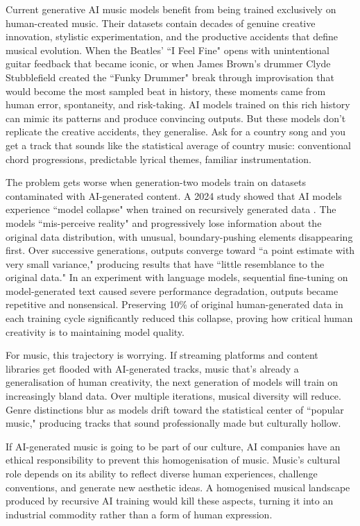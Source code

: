 \documentclass{article}
\begin{document}
Current generative AI music models benefit from being trained exclusively on human-created music. Their datasets contain decades of genuine creative innovation, stylistic experimentation, and the productive accidents that define musical evolution. When the Beatles' ``I Feel Fine" opens with unintentional guitar feedback that became iconic, or when James Brown's drummer Clyde Stubblefield created the ``Funky Drummer" break through improvisation that would become the most sampled beat in history, these moments came from human error, spontaneity, and risk-taking. AI models trained on this rich history can mimic its patterns and produce convincing outputs. But these models don't replicate the creative accidents, they generalise. Ask for a country song and you get a track that sounds like the statistical average of country music: conventional chord progressions, predictable lyrical themes, familiar instrumentation. 

The problem gets worse when generation-two models train on datasets contaminated with AI-generated content. A 2024 study showed that AI models experience ``model collapse" when trained on recursively generated data \cite{shumailov2024collapse}. The models ``mis-perceive reality" and progressively lose information about the original data distribution, with unusual, boundary-pushing elements disappearing first. Over successive generations, outputs converge toward ``a point estimate with very small variance," producing results that have ``little resemblance to the original data." In an experiment with language models, sequential fine-tuning on model-generated text caused severe performance degradation, outputs became repetitive and nonsensical. Preserving 10\% of original human-generated data in each training cycle significantly reduced this collapse, proving how critical human creativity is to maintaining model quality.

For music, this trajectory is worrying. If streaming platforms and content libraries get flooded with AI-generated tracks, music that's already a generalisation of human creativity, the next generation of models will train on increasingly bland data. Over multiple iterations, musical diversity will reduce. Genre distinctions blur as models drift toward the statistical center of ``popular music," producing tracks that sound professionally made but culturally hollow. 

If AI-generated music is going to be part of our culture, AI companies have an ethical responsibility to prevent this homogenisation of music. Music's cultural role depends on its ability to reflect diverse human experiences, challenge conventions, and generate new aesthetic ideas. A homogenised musical landscape produced by recursive AI training would kill these aspects, turning it into an industrial commodity rather than a form of human expression.
\end{document}
